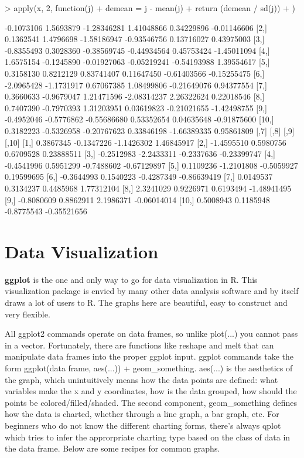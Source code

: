\documentclass{article}
\begin{document}
\begin{Schunk}
\begin{Sinput}
> apply(x, 2, function(j) {
+     demean = j - mean(j)
+     return (demean / sd(j))
+ })
\end{Sinput}
\begin{Soutput}
            [,1]       [,2]        [,3]        [,4]        [,5]        [,6]
 [1,] -0.1073106  1.5693879 -1.28346281  1.41048866  0.34229896 -0.01146606
 [2,]  0.1362541  1.4796698 -1.58186947 -0.93546756  0.13716027  0.43975003
 [3,] -0.8355493  0.3028360 -0.38569745 -0.44934564  0.45753424 -1.45011094
 [4,]  1.6575154 -0.1245890 -0.01927063 -0.05219241 -0.54193988  1.39554617
 [5,]  0.3158130  0.8212129  0.83741407  0.11647450 -0.61403566 -0.15255475
 [6,] -2.0965428 -1.1731917  0.67067385  1.08499806 -0.21649076  0.94377554
 [7,]  0.3660633 -0.9679047  1.21471596 -2.08314237  2.26322624  0.22018546
 [8,]  0.7407390 -0.7970393  1.31203951  0.03619823 -0.21021655 -1.42498755
 [9,] -0.4952046 -0.5776862 -0.55686680  0.53352654  0.04635648 -0.91875600
[10,]  0.3182223 -0.5326958 -0.20767623  0.33846198 -1.66389335  0.95861809
            [,7]       [,8]       [,9]       [,10]
 [1,]  0.3867345 -0.1347226 -1.1426302  1.46845917
 [2,] -1.4595510  0.5980756  0.6709528  0.23888511
 [3,] -0.2512983 -2.2433311 -0.2337636 -0.23399747
 [4,] -0.4541996  0.5951299 -0.7488602 -0.67129897
 [5,]  0.1109236 -1.2101808 -0.5059927  0.19599695
 [6,] -0.3644993  0.1540223 -0.4287349 -0.86639419
 [7,]  0.0149537  0.3134237  0.4485968  1.77312104
 [8,]  2.3241029  0.9226971  0.6193494 -1.48941495
 [9,] -0.8080609  0.8862911  2.1986371 -0.06014014
[10,]  0.5008943  0.1185948 -0.8775543 -0.35521656
\end{Soutput}
\end{Schunk}

\section{Data Visualization}

\textbf{ggplot} is the one and only way to go for data visualization in R.
This visualization package is envied by many other data analysis software
and by itself draws a lot of users to R.  The graphs here are beautiful,
easy to construct and very flexible.

All ggplot2 commands operate on data frames, so unlike plot(...) you
cannot pass in a vector.  Fortunately, there are functions like reshape
and melt that can manipulate data frames into the proper ggplot input. 
ggplot commands take the form ggplot(data frame, aes(...)) + geom\_something.
aes(...) is the aesthetics of the graph, which unintuitively means
how the data points are defined: what variables make the x and y coordinates,
how is the data grouped, how should the points be colored/filled/shaded.  The
second component, geom\_something defines how the data is charted, whether through
a line graph, a bar graph, etc.  For beginners who do not know the different
charting forms, there's always qplot which tries to infer the approrpriate
charting type based on the class of data in the data frame.
Below are some recipes for common graphs.
\end{document}

